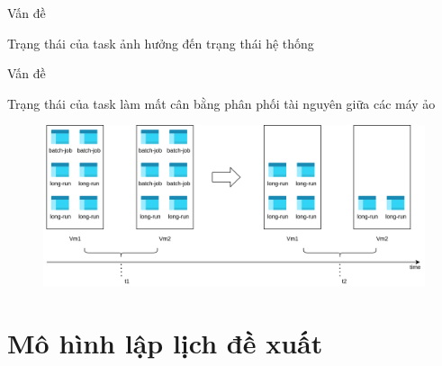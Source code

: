 \documentclass[11pt,xcolor={dvipsnames}, aspectratio=169]{beamer}
\begin{document}
\begin{frame}
{Vấn đề}

\begin{block}
{\centering Trạng thái của task ảnh hưởng đến trạng thái hệ thống}
\begin{figure}[h!]
    \centering
    \qquad
\end{figure}
\end{block}
\end{frame}

\begin{frame}
{Vấn đề}

\begin{block}
{Trạng thái của task làm mất cân bằng phân phối tài nguyên giữa các máy ảo}
\begin{figure}[h!]
    \centering
    \includegraphics[scale=0.5]{images/unload_balancing.png}
\end{figure}
\end{block}
\end{frame}

\section{Mô hình lập lịch đề xuất}
\end{document}
